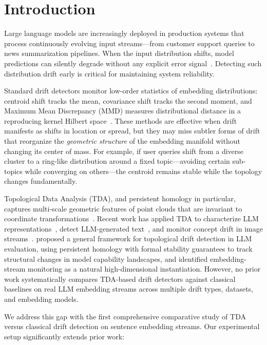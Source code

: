 \section{Introduction}
\label{sec:intro}

Large language models are increasingly deployed in production systems that process continuously evolving input streams---from customer support queries to news summarization pipelines. When the input distribution shifts, model predictions can silently degrade without any explicit error signal~\cite{khaki2023uncovering}. Detecting such distribution drift early is critical for maintaining system reliability.

Standard drift detectors monitor low-order statistics of embedding distributions: centroid shift tracks the mean, covariance shift tracks the second moment, and Maximum Mean Discrepancy (MMD) measures distributional distance in a reproducing kernel Hilbert space~\cite{khaki2023uncovering, sodar2023detecting}. These methods are effective when drift manifests as shifts in location or spread, but they may miss subtler forms of drift that reorganize the \emph{geometric structure} of the embedding manifold without changing its center of mass. For example, if user queries shift from a diverse cluster to a ring-like distribution around a fixed topic---avoiding certain sub-topics while converging on others---the centroid remains stable while the topology changes fundamentally.

Topological Data Analysis (TDA), and persistent homology in particular, captures multi-scale geometric features of point clouds that are invariant to coordinate transformations~\cite{tralie2019ripser, tauzin2020giotto}. Recent work has applied TDA to characterize LLM representations~\cite{gardinazzi2024persistent}, detect LLM-generated text~\cite{wei2025shortphd}, and monitor concept drift in image streams~\cite{basterrech2024unsupervised}. \citet{yang2026matheval} proposed a general framework for topological drift detection in LLM evaluation, using persistent homology with formal stability guarantees to track structural changes in model capability landscapes, and identified embedding-stream monitoring as a natural high-dimensional instantiation. However, no prior work systematically compares TDA-based drift detectors against classical baselines on real LLM embedding streams across multiple drift types, datasets, and embedding models.

We address this gap with the first comprehensive comparative study of TDA versus classical drift detection on sentence embedding streams. Our experimental setup significantly extends prior work:

